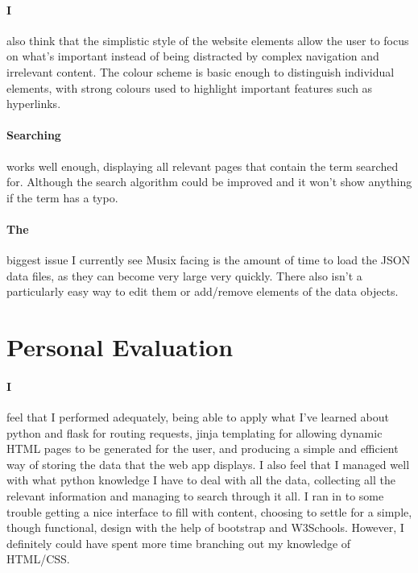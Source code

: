 \documentclass[10pt, a4paper]{article}
\begin{document}
    \paragraph{I} also think that the simplistic style of the website elements allow the user to focus on what's important instead of being distracted by complex navigation and irrelevant content. The colour scheme is basic enough to distinguish individual elements, with strong colours used to highlight important features such as hyperlinks.
    \paragraph{Searching} works well enough, displaying all relevant pages that contain the term searched for. Although the search algorithm could be improved and it won't show anything if the term has a typo.
    \paragraph{The} biggest issue I currently see Musix facing is the amount of time to load the JSON data files, as they can become very large very quickly. There also isn't a particularly easy way to edit them or add/remove elements of the data objects.
    
    \section{Personal Evaluation}
    \paragraph{I} feel that I performed adequately, being able to apply what I've learned about python and flask for routing requests, jinja templating for allowing dynamic HTML pages to be generated for the user, and producing a simple and efficient way of storing the data that the web app displays. I also feel that I managed well with what python knowledge I have to deal with all the data, collecting all the relevant information and managing to search through it all. I ran in to some trouble getting a nice interface to fill with content, choosing to settle for a simple, though functional, design with the help of bootstrap\cite{Bootstrap} and W3Schools\cite{W3Schools}. However, I definitely could have spent more time branching out my knowledge of HTML/CSS.
    
    
    
		
\end{document}
